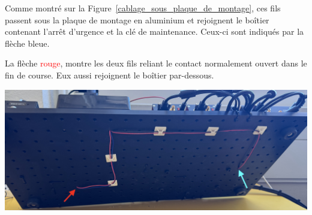 \begin{minipage}[c]{0.48\textwidth}
    Comme montré sur la Figure~\ref{cablage_sous_plaque_de_montage}, ces fils passent sous la plaque de montage en aluminium et rejoignent le boîtier contenant l'arrêt d'urgence et la clé de maintenance. Ceux-ci sont indiqués par la flèche \textcolor[RGB]{115, 210, 210}{bleue}.

    \vspace{1em}
    La flèche \textcolor{red}{rouge}, montre les deux fils reliant le contact normalement ouvert dans le fin de course. Eux aussi rejoignent le boîtier par-dessous.
\end{minipage}\hfill
\begin{minipage}[c]{0.48\textwidth}
    \begin{center}
        \includegraphics[width=\textwidth]{assets/figures/Protections_laser/Securite_electrique/cablage_sous_plaque_de_montage.jpeg}
    \end{center}
    \label{cablage_sous_plaque_de_montage}
\end{minipage}

